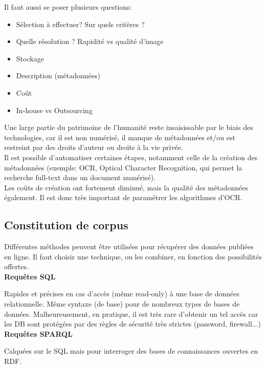 Il faut aussi se poser plusieurs questions:\\
\begin{itemize}
    \item Sélection à effectuer? Sur quels critères ?
    \item Quelle résolution ? Rapidité vs qualité d'image
    \item Stockage
    \item Description (métadonnées)
    \item Coût
    \item In-house vs Outsourcing\\
\end{itemize}

Une large partie du patrimoine de l'humanité reste insaisissable par le biais des technologies, car il est non numérisé,
il manque de métadonnées et/ou est restreint par des droits d'auteur ou droits à la vie privée.\\

Il est possible d'automatiser certaines étapes, notamment celle de la création des métadonnées
(exemple: OCR, Optical Character Recognition, qui permet la recherche full-text dans un document numérisé).\\

Les coûts de création ont fortement diminué, mais la qualité des métadonnées également.
Il est donc très important de paramétrer les algorithmes d'OCR.\\

\subsection{Constitution de corpus}

Différentes méthodes peuvent être utilisées pour récupérer des données publiées en ligne.
Il faut choisir une technique, ou les combiner, en fonction des possibilités offertes.\\

\textbf{Requêtes SQL}

Rapides et précises en cas d'accès (même read-only) à une base de données relationnelle.
Même syntaxe (de base) pour de nombreux types de bases de données.
Malheureusement, en pratique, il est très rare d'obtenir un tel accès car les DB sont protégées par des règles de sécurité très strictes (password, firewall...)\\

\textbf{Requêtes SPARQL}

Calquées sur le SQL mais pour interroger des bases de connaissances ouvertes en RDF.\\

